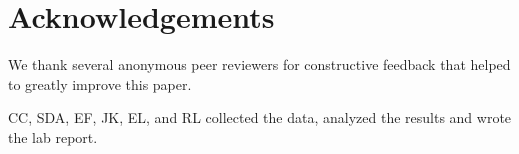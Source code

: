 \documentclass[reprint,amsmath,amssymb,aps]{revtex4-2}
\begin{document}
\section{Acknowledgements}
\label{sec:acknowledgements}
We thank several anonymous peer reviewers for constructive feedback that helped to greatly improve this paper.

CC, SDA, EF, JK, EL, and RL collected the data, analyzed the results and wrote the lab report.


%

\end{document}
